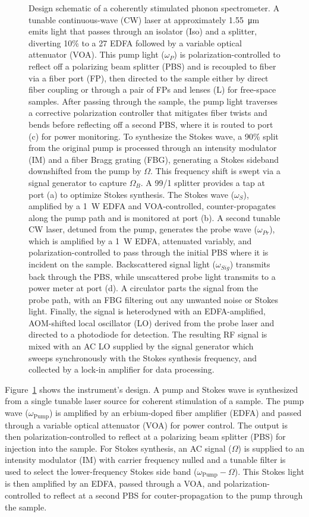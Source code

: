 \begin{figure}[htbp]
{Design schematic of a coherently stimulated phonon spectrometer. A tunable continuous-wave (CW) laser at approximately \SI{1.55}{\micro\meter} emits light that passes through an isolator (Iso) and a splitter, diverting 10\% to a \SI{27}{\dBm} EDFA followed by a variable optical attenuator (VOA). This pump light (\(\omega_P\)) is polarization-controlled to reflect off a polarizing beam splitter (PBS) and is recoupled to fiber via a fiber port (FP), then directed to the sample either by direct fiber coupling or through a pair of FPs and lenses (L) for free-space samples. After passing through the sample, the pump light traverses a corrective polarization controller that mitigates fiber twists and bends before reflecting off a second PBS, where it is routed to port (c) for power monitoring. To synthesize the Stokes wave, a 90\% split from the original pump is processed through an intensity modulator (IM) and a fiber Bragg grating (FBG), generating a Stokes sideband downshifted from the pump by \(\Omega\). This frequency shift is swept via a signal generator to capture \(\Omega_B\). A 99/1 splitter provides a tap at port (a) to optimize Stokes synthesis. The Stokes wave (\(\omega_S\)), amplified by a \SI{1}{\watt} EDFA and VOA-controlled, counter-propagates along the pump path and is monitored at port (b). A second tunable CW laser, detuned from the pump, generates the probe wave (\(\omega_{Pr}\)), which is amplified by a \SI{1}{\watt} EDFA, attenuated variably, and polarization-controlled to pass through the initial PBS where it is incident on the sample. Backscattered signal light (\(\omega_{Sig}\)) transmits back through the PBS, while unscattered probe light transmits to a power meter at port (d). A circulator parts the signal from the probe path, with an FBG filtering out any unwanted noise or Stokes light. Finally, the signal is heterodyned with an EDFA-amplified, AOM-shifted local oscillator (LO) derived from the probe laser and directed to a photodiode for detection. The resulting RF signal is mixed with an AC LO supplied by the signal generator which sweeps synchronously with the Stokes synthesis frequency, and collected by a lock-in amplifier for data processing.
}
\label{fig:Instrument Design}
\end{figure}

Figure~\ref{fig:Instrument Design} shows the instrument’s design. A pump and Stokes wave is synthesized from a single tunable laser source for coherent stimulation of a sample. The pump wave (\(\omega_{\mathrm{Pump}}\)) is amplified by an erbium-doped fiber amplifier (EDFA) and passed through a variable optical attenuator (VOA) for power control. The output is then polarization-controlled to reflect at a polarizing beam splitter (PBS) for injection into the sample. For Stokes synthesis, an AC signal (\(\Omega\)) is supplied to an intensity modulator (IM) with carrier frequency nulled and a tunable filter is used to select the lower-frequency Stokes side band (\(\omega_{\mathrm{Pump}} - \Omega\)). This Stokes light is then amplified by an EDFA, passed through a VOA, and polarization-controlled to reflect at a second PBS for couter-propagation to the pump through the sample.

